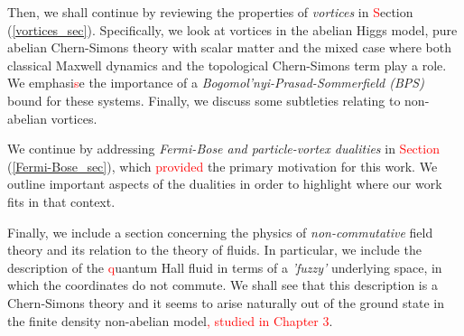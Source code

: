     Then, we shall continue by reviewing the properties of \textit{vortices} in \textcolor{red}{S}ection (\ref{vortices_sec}). Specifically, we look at vortices in the abelian Higgs model, pure abelian Chern-Simons theory with scalar matter and the mixed case where both classical Maxwell dynamics and the topological Chern-Simons term play a role. We emphasi\textcolor{red}{s}e the importance of a \textit{Bogomol'nyi-Prasad-Sommerfield (BPS)} \cite{Bogomolny:1975de, Prasad:1975kr} bound for these systems. Finally, we discuss some subtleties relating to non-abelian vortices.

    We continue by addressing \textit{Fermi-Bose and particle-vortex dualities} in \textcolor{red}{Section} (\ref{Fermi-Bose_sec}), which \textcolor{red}{provided} the primary motivation for this work. \colorbox{red}{ }  We outline important aspects of the dualities in order to highlight where our work fits in that context.

    Finally, we include a section concerning the physics of \textit{non-commutative} field theory and its relation to the theory of fluids. In particular, we include the description of the \textcolor{red}{q}uantum Hall fluid in terms of a \textit{'fuzzy'} underlying space, in which the coordinates do not commute. We shall see that this description is a Chern-Simons theory and it seems to arise naturally out of the ground state in the finite density non-abelian model\textcolor{red}{, studied in Chapter 3}.

